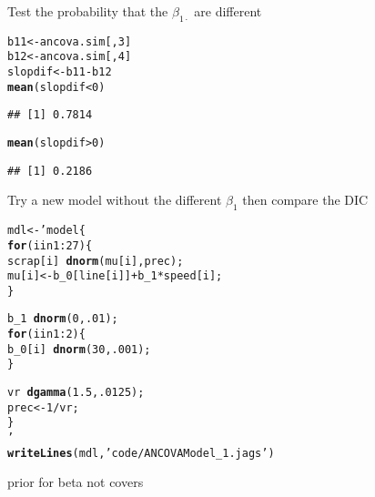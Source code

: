 \documentclass[12pt,letterpaper,oneside]{article}\usepackage{graphicx, color}
\makeatletter
\newcommand{\hlfunctioncall}[1]{\textcolor[rgb]{0.501960784313725,0,0.329411764705882}{\textbf{#1}}}%
\newcommand{\hlstring}[1]{\textcolor[rgb]{0.6,0.6,1}{#1}}%
\newenvironment{kframe}{%
 \def\at@end@of@kframe{}%
 \ifinner\ifhmode%
  \def\at@end@of@kframe{\end{minipage}}%
  \begin{minipage}{\columnwidth}%
 \fi\fi%
 \def\FrameCommand##1{\hskip\@totalleftmargin \hskip-\fboxsep
 \colorbox{shadecolor}{##1}\hskip-\fboxsep
     \hskip-\linewidth \hskip-\@totalleftmargin \hskip\columnwidth}%
 \MakeFramed {\advance\hsize-\width
   \@totalleftmargin\z@ \linewidth\hsize
   \@setminipage}}%
 {\par\unskip\endMakeFramed%
 \at@end@of@kframe}
\newenvironment{knitrout}{}{} %
\makeatother
\begin{document}
Test the probability that the $\beta_{1\cdot}$ are different
\begin{knitrout}\scriptsize
{}\color{fgcolor}\begin{kframe}
\begin{alltt}
b11 <- ancova.sim[, 3]
b12 <- ancova.sim[, 4]
slopdif <- b11 - b12
\hlfunctioncall{mean}(slopdif < 0)
\end{alltt}
\begin{verbatim}
## [1] 0.7814
\end{verbatim}
\begin{alltt}
\hlfunctioncall{mean}(slopdif > 0)
\end{alltt}
\begin{verbatim}
## [1] 0.2186
\end{verbatim}
\end{kframe}
\end{knitrout}


Try a new model without the different $\beta_{1}$ then compare the DIC

\begin{knitrout}\scriptsize
{}\color{fgcolor}\begin{kframe}
\begin{alltt}
mdl <- 'model \{
    \hlfunctioncall{for}(i in 1:27) \{
        scrap[i] ~ \hlfunctioncall{dnorm}(mu[i], prec);
        mu[i] <- b_0[line[i]] + b_1*speed[i];
    \}

    b_1 ~ \hlfunctioncall{dnorm}(0, .01);
    \hlfunctioncall{for} (i in 1:2) \{
        b_0[i] ~ \hlfunctioncall{dnorm}(30, .001);
    \}

    vr ~ \hlfunctioncall{dgamma}(1.5, .0125);
    prec <- 1/vr;
\}
'
\hlfunctioncall{writeLines}(mdl, \hlstring{'code/ANCOVAModel_1.jags'})
\end{alltt}
\end{kframe}
\end{knitrout}

prior for beta not covers
\end{document}
